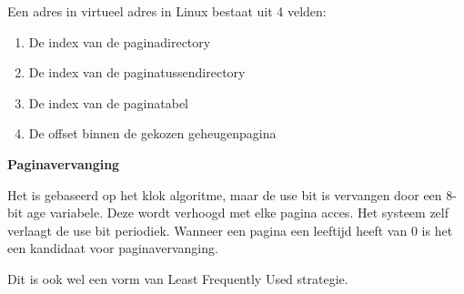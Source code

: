 Een adres in virtueel adres in Linux bestaat uit 4 velden:

\begin{enumerate}
\item De index van de paginadirectory
\item De index van de paginatussendirectory
\item De index van de paginatabel
\item De offset binnen de gekozen geheugenpagina
\end{enumerate}


\textbf{Paginavervanging}

Het is gebaseerd op het klok algoritme, maar de use bit is vervangen door een 8-bit age variabele. Deze wordt verhoogd met elke pagina acces. Het systeem zelf verlaagt de use bit periodiek. Wanneer een pagina een leeftijd heeft van 0 is het een kandidaat voor paginavervanging.

Dit is ook wel een vorm van Least Frequently Used strategie.
